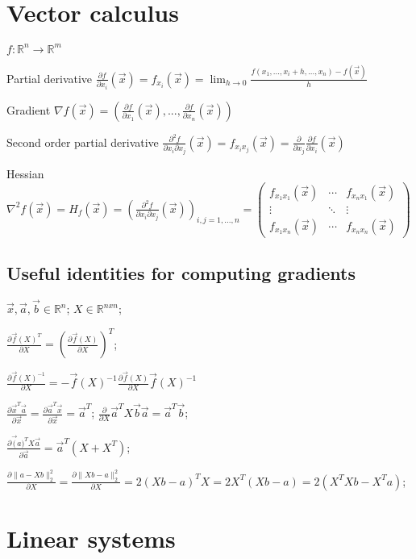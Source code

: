 \documentclass[]{article}
\newcommand{\cfi}[1]{f_{x_{#1}}(\vec{x})}
\newcommand{\pfi}[1]{\frac{\partial f}{\partial x_{#1}}(\vec{x})}
\newcommand{\scfi}[2]{f_{x_{#1}x_{#2}}(\vec{x})}
\newcommand{\spfi}[2]{\frac{\partial^2 f}{\partial x_{#1} \partial x_{#2}}(\vec{x})}
\begin{document}
	\section{Vector calculus}
	
	$f : \mathbb{R}^n \to \mathbb{R}^m$
	
	Partial derivative $\pfi{i}=\cfi{i}=\lim_{h\to 0}{\frac{f(x_{1},...,x_{i}+h,...,x_{n})-f(\vec{x})}{h}}$
	
	Gradient $\nabla f(\vec{x}) = \left(\pfi{1},...,\pfi{n}\right)$

	Second order partial derivative $\spfi{i}{j}=\scfi{i}{j}=\frac{\partial}{\partial x_{j}}\pfi{i}$
	
	Hessian $\nabla^2 f(\vec{x}) = H_{f}(\vec{x})=\left(\spfi{i}{j}\right)_{i,j=1,...,n} = \begin{pmatrix}
		\scfi{1}{1} & \cdots & \scfi{n}{1} \\
		\vdots & \ddots & \vdots \\
		\scfi{1}{n} & \cdots & \scfi{n}{n}
	\end{pmatrix}$

	\subsection{Useful identities for computing gradients}
	
	$\vec{x}, \vec{a}, \vec{b} \in \mathbb{R}^{n}$;
	$X \in \mathbb{R}^{nxn}$;
	
	$\frac{\partial \vec{f}(X)^T}{\partial X} = \left(\frac{\partial \vec{f}(X)}{\partial X}\right)^T$;
	
	$\frac{\partial \vec{f}(X)^{-1}}{\partial X}  = - \vec{f}(X)^{-1} \frac{\partial \vec{f}(X)}{\partial X} \vec{f}(X)^{-1}$
	
	$\frac{\partial \vec{x}^T \vec{a}}{\partial \vec{x}} = \frac{\partial \vec{a}^T \vec{x}}{\partial \vec{x}} = \vec{a}^T$;
	$\frac{\partial}{\partial X} \vec{a}^T X \vec{b} \vec{a} = \vec{a}^T \vec{b}$;
	
	$\frac{\partial \vec(a)^T X \vec{a}}{\partial \vec{a}} = \vec{a}^T (X + X^T)$;
	
	$\frac{\partial \lVert a-Xb\rVert_2^2}{\partial X} = \frac{\partial \lVert Xb-a\rVert_2^2}{\partial X} = 2(Xb-a)^T X = 2 X^T (Xb-a) = 2(X^T X b - X^T a)$;

	\section{Linear systems}
	
\end{document}
